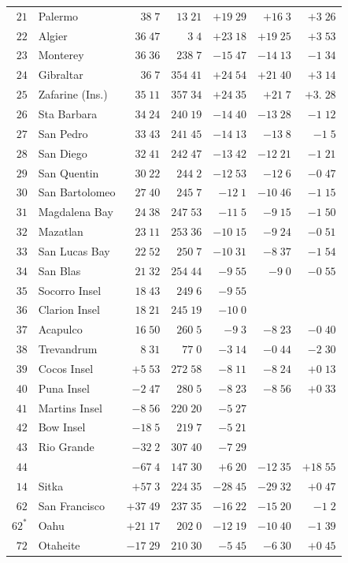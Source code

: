 \begin{center}
\begin{tabular}{rl|r|r||r|r|r}
$21$&Palermo&$38\;7$&$13\;21$&$+19\;29$&$+16\;3$&$+3\;26$\\
$22$&Algier&$36\;47$&$3\;4$&$+23\;18$&$+19\;25$&$+3\;53$\\
$23$&Monterey&$36\;36$&$238\;7$&$-15\;47$&$-14\;13$&$-1\;34$\\
$24$&Gibraltar&$36\;7$&$354\;41$&$+24\;54$&$+21\;40$&$+3\;14$\\
$25$&Zafarine (Ins.)&$35\;11$&$357\;34$&$+24\;35$&$+21\;7$&$+3.\;28$\\
$26$&Sta Barbara&$34\;24$&$240\;19$&$-14\;40$&$-13\;28$&$-1\;12$\\
$27$&San Pedro&$33\;43$&$241\;45$&$-14\;13$&$-13\;8$&$-1\;5$\\
$28$&San Diego&$32\;41$&$242\;47$&$-13\;42$&$-12\;21$&$-1\;21$\\
$29$&San Quentin&$30\;22$&$244\;2$&$-12\;53$&$-12\;6$&$-0\;47$\\
$30$&San Bartolomeo&$27\;40$&$245\;7$&$-12\;1$&$-10\;46$&$-1\;15$\\[2pt]
$31$&Magdalena Bay&$24\;38$&$247\;53$&$-11\;5$&$-9\;15$&$-1\;50$\\
$32$&Mazatlan&$23\;11$&$253\;36$&$-10\;15$&$-9\;24$&$-0\;51$\\
$33$&San Lucas Bay&$22\;52$&$250\;7$&$-10\;31$&$-8\;37$&$-1\;54$\\
$34$&San Blas&$21\;32$&$254\;44$&$-9\;55$&$-9\;0$&$-0\;55$\\
$35$&Socorro Insel&$18\;43$&$249\;6$&$-9\;55$&&\\
$36$&Clarion Insel&$18\;21$&$245\;19$&$-10\;0$&&\\
$37$&Acapulco&$16\;50$&$260\;5$&$-9\;3$&$-8\;23$&$-0\;40$\\
$38$&Trevandrum&$8\;31$&$77\;0$&$-3\;14$&$-0\;44$&$-2\;30$\\
$39$&Cocos Insel&$+5\;53$&$272\;58$&$-8\;11$&$-8\;24$&$+0\;13$\\
$40$&Puna Insel&$-2\;47$&$280\;5$&$-8\;23$&$-8\;56$&$+0\;33$\\[2pt]
$41$&Martins Insel&$-8\;56$&$220\;20$&$-5\;27$&&\\
$42$&Bow Insel&$-18\;5$&$219\;7$&$-5\;21$&&\\
$43$&Rio Grande&$-32\;2$&$307\;40$&$-7\;29$&&\\
$44$&&$-67\;4$&$147\;30$&$+6\;20$&$-12\;35$&$+18\;55$\\
$14$&Sitka&$+57\;3$&$224\;35$&$-28\;45$&$-29\;32$&$+0\;47$\\
$62$&San Francisco&$+37\;49$&$237\;35$&$-16\;22$&$-15\;20$&$-1\;2$\\
$62^{*}$&Oahu&$+21\;17$&$202\;0$&$-12\;19$&$-10\;40$&$-1\;39$\\
$72$&Otaheite&$-17\;29$&$210\;30$&$-5\;45$&$-6\;30$&$+0\;45$\\
\hline
\end{tabular}
\end{center}
